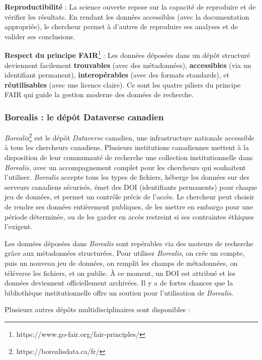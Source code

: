 \documentclass[
  letterpaper,
  DIV=11,
  numbers=noendperiod,
  oneside]{scrreprt}
\begin{document}
\textbf{Reproductibilité} : La science ouverte repose sur la capacité de
reproduire et de vérifier les résultats. En rendant les données
accessibles (avec la documentation appropriée), le chercheur permet à
d'autres de reproduire ses analyses et de valider ses conclusions.

\textbf{Respect du principe FAIR}\footnote{https://www.go-fair.org/fair-principles/}
: Les données déposées dans un dépôt structuré deviennent facilement
\textbf{trouvables} (avec des métadonnées), \textbf{accessibles} (via un
identifiant permanent), \textbf{interopérables} (avec des formats
standards), et \textbf{réutilisables} (avec une licence claire). Ce sont
les quatre piliers du principe FAIR qui guide la gestion moderne des
données de recherche.

\hypertarget{borealis-le-duxe9puxf4t-dataverse-canadien}{%
\subsubsection{Borealis : le dépôt Dataverse
canadien}\label{borealis-le-duxe9puxf4t-dataverse-canadien}}

\emph{Borealis}\footnote{https://borealisdata.ca/fr/} est le dépôt
\emph{Dataverse} canadien, une infrastructure nationale accessible à
tous les chercheurs canadiens. Plusieurs institutions canadiennes
mettent à la disposition de leur communauté de recherche une collection
institutionnelle dans \emph{Borealis}, avec un accompagnement complet
pour les chercheurs qui souhaitent l'utiliser. \emph{Borealis} accepte
tous les types de fichiers, héberge les données sur des serveurs
canadiens sécurisés, émet des DOI (identifiants permanents) pour chaque
jeu de données, et permet un contrôle précis de l'accès. Le chercheur
peut choisir de rendre ses données entièrement publiques, de les mettre
en embargo pour une période déterminée, ou de les garder en accès
restreint si ses contraintes éthiques l'exigent.

Les données déposées dans \emph{Borealis} sont repérables via des
moteurs de recherche grâce aux métadonnées structurées. Pour utiliser
\emph{Borealis}, on crée un compte, puis un nouveau jeu de données, on
remplit les champs de métadonnées, on téléverse les fichiers, et on
publie. À ce moment, un DOI est attribué et les données deviennent
officiellement archivées. Il y a de fortes chances que la bibliothèque
institutionnelle offre un soutien pour l'utilisation de \emph{Borealis}.

Plusieurs autres dépôts multidisciplinaires sont disponibles :
\end{document}
